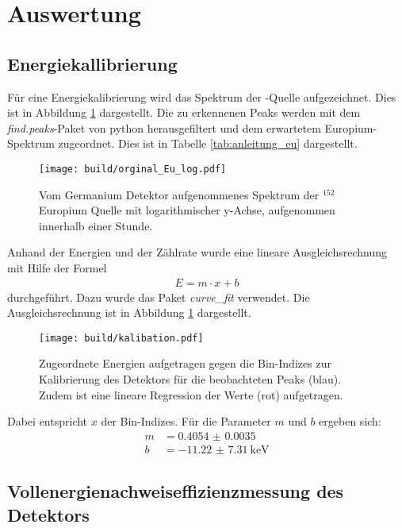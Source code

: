 \newpage
\section{Auswertung}
\label{sec:Auswertung}

\subsection{Energiekallibrierung}
\label{sec:Energiekallibrierung}

Für eine Energiekalibrierung wird das Spektrum der -Quelle
aufgezeichnet. Dies ist in Abbildung \ref{plt:Eu-Spektrum} dargestellt. Die zu
erkennenen Peaks werden mit dem \textit{find.peaks}-Paket von python
herausgefiltert und dem erwartetem Europium-Spektrum zugeordnet. Dies ist in
Tabelle \ref{tab:anleitung_eu} dargestellt.
\begin{figure}[htb]
    \centering
    \texttt{[image: build/orginal\_Eu\_log.pdf]}
  \caption{Vom Germanium Detektor aufgenommenes Spektrum der $^{152}$Europium Quelle mit
  logarithmischer y-Achse, aufgenommen innerhalb einer Stunde.}
  \label{plt:Eu-Spektrum}
\end{figure}
Anhand der Energien und der Zählrate wurde eine lineare Ausgleichsrechnung
mit Hilfe der Formel
\begin{align*}
  E = m \cdot x + b
\end{align*}
durchgeführt. Dazu wurde das Paket \textit{curve\_fit} verwendet. Die
Ausgleichsrechnung ist in Abbildung \ref{plt:Eu-Spektrum} dargestellt.
\begin{figure}[htb]
  \centering
  \texttt{[image: build/kalibation.pdf]}
  \caption{Zugeordnete Energien aufgetragen gegen die Bin-Indizes zur
  Kalibrierung des Detektors für die beobachteten Peaks (blau). Zudem ist eine
  lineare Regression der Werte (rot) aufgetragen.}
  \label{plt:eichung}
\end{figure}
Dabei entspricht $x$ der Bin-Indizes. Für die Parameter $m$ und
$b$ ergeben sich:
\begin{align*}
	m &= \num{0.4054(35)} \\
  b &= \SI{-11.22(731)}{\kilo\electronvolt}
\end{align*}

\FloatBarrier

\subsection{Vollenergienachweiseffizienzmessung des Detektors}
\label{sec:Effizienzmessung}

